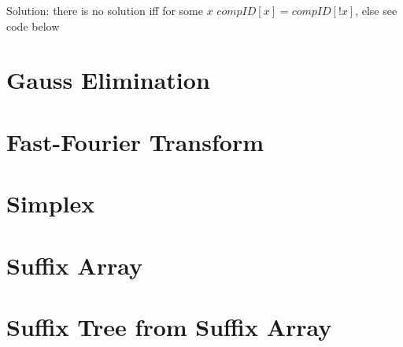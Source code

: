 \documentclass[10pt]{article}
\begin{document}
Solution: there is no solution iff for some $x$ $compID[x] = compID[!x]$, else see code below


\section{Gauss Elimination}

\section{Fast-Fourier Transform}

\section{Simplex}


\section{Suffix Array}

\section{Suffix Tree from Suffix Array}

\end{document}
